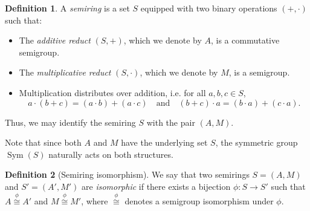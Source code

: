\documentclass{article}
\theoremstyle{definition}
\newtheorem{definition}{Definition}
\begin{document}
\begin{definition}
    A \emph{semiring} is a set \(S\) equipped with two binary operations \((+, \cdot)\) such that:
    \begin{itemize}
        \item The \emph{additive reduct} \((S, +)\), which we denote by \(A\), is a commutative semigroup.
        \item The \emph{multiplicative reduct} \((S, \cdot)\), which we denote by \(M\), is a semigroup.
        \item Multiplication distributes over addition, i.e. for all \(a, b, c \in S\),
        \[
        a \cdot (b + c) = (a \cdot b) + (a \cdot c) \quad \text{and} \quad (b + c) \cdot a = (b \cdot a) + (c \cdot a).
        \]
    \end{itemize}
    Thus, we may identify the semiring \(S\) with the pair \((A, M)\).
    \end{definition}
    Note that since both \(A\) and \(M\) have the underlying set 
    \(S\), the symmetric group \(\operatorname{Sym}(S)\) naturally acts on both structures.
    \begin{definition}[Semiring isomorphism]
        We say that two semirings \(S = (A, M)\) and \(S' = (A', M')\) are \emph{isomorphic} if there exists a bijection \(\phi: S \to S'\) such that \(A \overset{\phi}\cong A'\) and \(M \overset{\phi}\cong M'\), where \(\overset{\phi}\cong\) denotes a semigroup isomorphism under \(\phi\).
    \end{definition}
\end{document}
